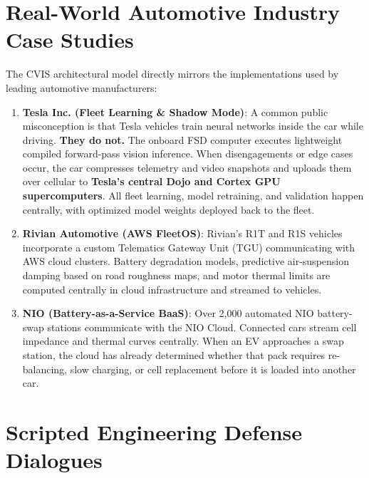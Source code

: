 \documentclass[12pt,a4paper]{report}
\begin{document}
\section{Real-World Automotive Industry Case Studies}

The CVIS architectural model directly mirrors the implementations used by leading automotive manufacturers:

\begin{enumerate}[leftmargin=1.5cm]
  \item \textbf{Tesla Inc. (Fleet Learning \& Shadow Mode)}: A common public misconception is that Tesla vehicles train neural networks inside the car while driving. \textbf{They do not.} The onboard FSD computer executes lightweight compiled forward-pass vision inference. When disengagements or edge cases occur, the car compresses telemetry and video snapshots and uploads them over cellular to \textbf{Tesla's central Dojo and Cortex GPU supercomputers}. All fleet learning, model retraining, and validation happen centrally, with optimized model weights deployed back to the fleet.
  \item \textbf{Rivian Automotive (AWS FleetOS)}: Rivian's R1T and R1S vehicles incorporate a custom Telematics Gateway Unit (TGU) communicating with AWS cloud clusters. Battery degradation models, predictive air-suspension damping based on road roughness maps, and motor thermal limits are computed centrally in cloud infrastructure and streamed to vehicles.
  \item \textbf{NIO (Battery-as-a-Service BaaS)}: Over 2,000 automated NIO battery-swap stations communicate with the NIO Cloud. Connected cars stream cell impedance and thermal curves centrally. When an EV approaches a swap station, the cloud has already determined whether that pack requires re-balancing, slow charging, or cell replacement before it is loaded into another car.
\end{enumerate}

\section{Scripted Engineering Defense Dialogues}
\end{document}
